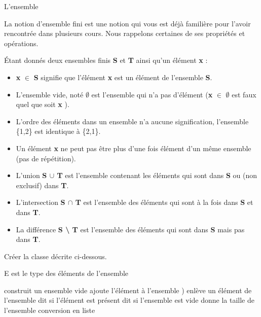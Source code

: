 \begin{Exercice}{L'ensemble}

	La notion d’ensemble fini est une notion qui vous est déjà 
	familière pour l’avoir rencontrée dans plusieurs cours. Nous rappelons
	certaines de ses propriétés et opérations. 
			
	Étant donnés deux ensembles
	finis \textbf{S} et \textbf{T} ainsi qu’un élément \textbf{x} :

	\begin{itemize}
	\item 
		\textbf{x} {${\in}$} \textbf{S} signifie que l’élément \textbf{x}
		est un élément de l’ensemble \textbf{S}.
	\item 
		L’ensemble vide, noté \textbf{${\emptyset}$} 
		est l’ensemble qui n’a pas d’élément 
		(\textbf{x} {${\in}$} \textbf{${\emptyset}$} 
		est faux quel que soit \textbf{x} ).
	\item 
		L’ordre des éléments dans un ensemble n’a
		aucune signification, l’ensemble \{1,2\} est
		identique à \{2,1\}.
	\item 
		Un élément \textbf{x} ne peut
		pas être plus d’une fois élément d’un même ensemble 
		(pas de répétition).
	\item 
		L’union \textbf{S ${\cup}$ T} 
		est l’ensemble contenant les éléments qui sont dans 
		\textbf{S} ou (non exclusif) dans \textbf{T}.
	\item 
		L’intersection \textbf{S ${\cap}$ T} 
		est l’ensemble des éléments qui sont à la fois 
		dans \textbf{S} et dans \textbf{T}.
	\item 
		La différence \textbf{S {\textbackslash} T} 
		est l’ensemble des éléments qui sont 
		dans \textbf{S} mais pas dans \textbf{T}.
	\end{itemize}
	
	Créer la classe 
	décrite ci-dessous.
	
	\begin{LDA}
		\RComment E est le type des éléments de l'ensemble
		
			\Public
			\RComment construit un ensemble vide
			\RComment ajoute l'élément à l'ensemble
			)
			\RComment enlève un élément de l'ensemble
			\RComment dit si l'élément est présent
			\RComment dit si l'ensemble est vide
			\RComment donne la taille de l'ensemble
			\RComment conversion en liste
		\EndClass
	\end{LDA}
		

\end{Exercice}
